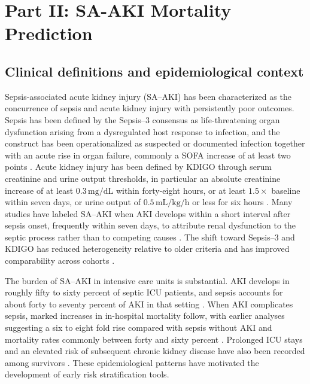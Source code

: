 \section{Part II: SA-AKI Mortality Prediction}\label{sec:saaki-lit}

\subsection{Clinical definitions and epidemiological context}
Sepsis-associated acute kidney injury (SA--AKI) has been characterized as the concurrence of sepsis and acute kidney injury with persistently poor outcomes. Sepsis has been defined by the Sepsis--3 consensus as life-threatening organ dysfunction arising from a dysregulated host response to infection, and the construct has been operationalized as suspected or documented infection together with an acute rise in organ failure, commonly a SOFA increase of at least two points \citep{Singer_2016}. Acute kidney injury has been defined by KDIGO through serum creatinine and urine output thresholds, in particular an absolute creatinine increase of at least $0.3\,\mathrm{mg/dL}$ within forty-eight hours, or at least $1.5\times$ baseline within seven days, or urine output of $0.5\,\mathrm{mL/kg/h}$ or less for six hours \citep{KDIGO_2012}. Many studies have labeled SA--AKI when AKI develops within a short interval after sepsis onset, frequently within seven days, to attribute renal dysfunction to the septic process rather than to competing causes \citep{Peerapornratana_2019,Poston_Koyner_2019}. The shift toward Sepsis--3 and KDIGO has reduced heterogeneity relative to older criteria and has improved comparability across cohorts \citep{Singer_2016,KDIGO_2012}.

The burden of SA--AKI in intensive care units is substantial. AKI develops in roughly fifty to sixty percent of septic ICU patients, and sepsis accounts for about forty to seventy percent of AKI in that setting \citep{Peerapornratana_2019,Poston_Koyner_2019}. When AKI complicates sepsis, marked increases in in-hospital mortality follow, with earlier analyses suggesting a six to eight fold rise compared with sepsis without AKI and mortality rates commonly between forty and sixty percent \citep{Poston_Koyner_2019,Peerapornratana_2019}. Prolonged ICU stays and an elevated risk of subsequent chronic kidney disease have also been recorded among survivors \citep{Poston_Koyner_2019,Peerapornratana_2019}. These epidemiological patterns have motivated the development of early risk stratification tools.

